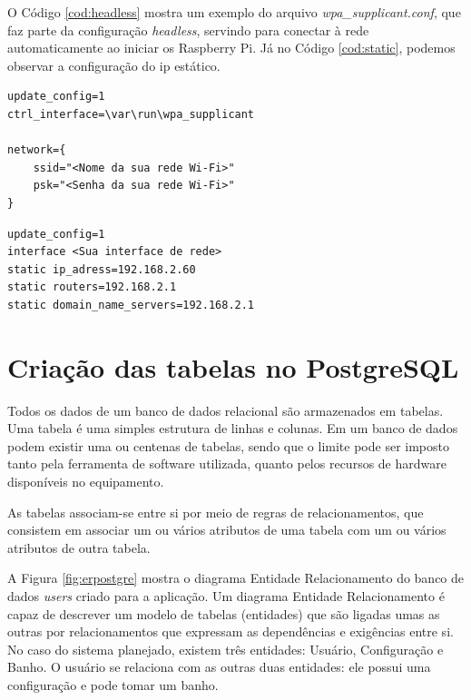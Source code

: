 O Código \ref{cod:headless} mostra um exemplo do arquivo \textit{wpa\_supplicant.conf}, que faz parte da configuração \textit{headless}, servindo para conectar à rede automaticamente ao iniciar os Raspberry Pi. Já no Código \ref{cod:static}, podemos observar a configuração do ip estático.

\begin{lstlisting}[caption=Exemplo de configuração \textit{headless}, label=cod:headless]
update_config=1
ctrl_interface=\var\run\wpa_supplicant

network={
    ssid="<Nome da sua rede Wi-Fi>"
    psk="<Senha da sua rede Wi-Fi>"
}
\end{lstlisting}

\newpage

\begin{lstlisting}[caption=Exemplo de configuração do IP estático, label=cod:static]
update_config=1
interface <Sua interface de rede>
static ip_adress=192.168.2.60
static routers=192.168.2.1
static domain_name_servers=192.168.2.1
\end{lstlisting}



\section{Criação das tabelas no PostgreSQL}

Todos os dados de um banco de dados relacional são armazenados em tabelas. Uma tabela é uma simples estrutura de linhas e colunas. Em um banco de dados podem existir uma ou centenas de tabelas, sendo que o limite pode ser imposto tanto pela ferramenta de software utilizada, quanto pelos recursos de hardware disponíveis no equipamento.

As tabelas associam-se entre si por meio de regras de relacionamentos, que consistem em associar um ou vários atributos de uma tabela com um ou vários atributos de outra tabela.

A Figura \ref{fig:erpostgre} mostra o diagrama Entidade Relacionamento do banco de dados \textit{users} criado para a aplicação. Um diagrama Entidade Relacionamento é capaz de descrever um modelo de tabelas (entidades) que são ligadas umas as outras por relacionamentos que expressam as dependências e exigências entre si. No caso do sistema planejado, existem três entidades: Usuário, Configuração e Banho. O usuário se relaciona com as outras duas entidades: ele possui uma configuração e pode tomar um banho.

